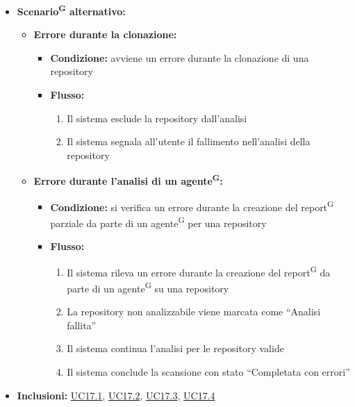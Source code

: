 \documentclass[a4paper, 11pt]{article}
\begin{document}
\begin{itemize}
\begin{enumerate}
		\item Gli agenti eseguono le analisi parziali sulle repository assegnate (\hyperref[UC17.3]{UC17.3 - Esegui analisi parziale})
		\item L'orchestratore raccoglie i report\textsuperscript{G} parziali e genera il report\textsuperscript{G} completo (\hyperref[UC17.4]{UC17.4 - Aggrega report e salva risultati})
	\end{enumerate}
	\item \textbf{Scenario\textsuperscript{G} alternativo:}
	\begin{itemize}
		\item \textbf{Errore durante la clonazione:}
			\begin{itemize}
				\item \textbf{Condizione:} avviene un errore durante la clonazione di una repository
				\item \textbf{Flusso:}
				\begin{enumerate}
					\item Il sistema esclude la repository dall'analisi
					\item Il sistema segnala all'utente il fallimento nell'analisi della repository
				\end{enumerate}
			\end{itemize}
		\item \textbf{Errore durante l'analisi di un agente\textsuperscript{G}:}
			\begin{itemize}
				\item \textbf{Condizione:} si verifica un errore durante la creazione del report\textsuperscript{G} parziale da parte di un agente\textsuperscript{G} per una repository
				\item \textbf{Flusso:}
				\begin{enumerate}
					\item Il sistema rileva un errore durante la creazione del report\textsuperscript{G} da parte di un agente\textsuperscript{G} su una repository
					\item La repository non analizzabile viene marcata come “Analisi fallita”
					\item Il sistema continua l'analisi per le repository valide
					\item Il sistema conclude la scansione con stato “Completata con errori”
				\end{enumerate}
			\end{itemize}
	\end{itemize}
	\item \textbf{Inclusioni:} \hyperref[UC17.1]{UC17.1}, \hyperref[UC17.2]{UC17.2}, \hyperref[UC17.3]{UC17.3}, \hyperref[UC17.4]{UC17.4}
\end{itemize}
\end{document}
